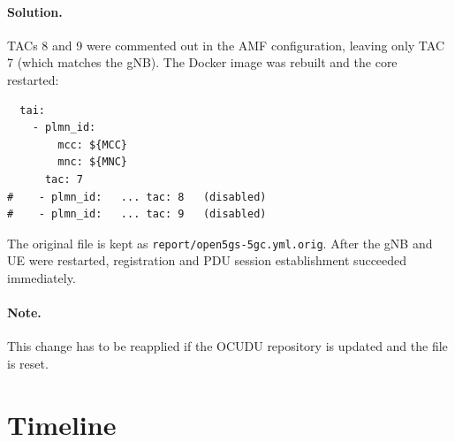 \documentclass[11pt,a4paper]{article}
\newcommand{\fpath}[1]{\texttt{#1}}
\begin{document}
\paragraph{Solution.} TACs 8 and 9 were commented out in the AMF
configuration, leaving only TAC 7 (which matches the gNB). The Docker image
was rebuilt and the core restarted:
\begin{lstlisting}
  tai:
    - plmn_id:
        mcc: ${MCC}
        mnc: ${MNC}
      tac: 7
#    - plmn_id:   ... tac: 8   (disabled)
#    - plmn_id:   ... tac: 9   (disabled)
\end{lstlisting}
The original file is kept as \fpath{report/open5gs-5gc.yml.orig}. After the gNB
and UE were restarted, registration and PDU session establishment succeeded
immediately.

\paragraph{Note.} This change has to be reapplied if the OCUDU repository is
updated and the file is reset.

\section{Timeline}
\end{document}
